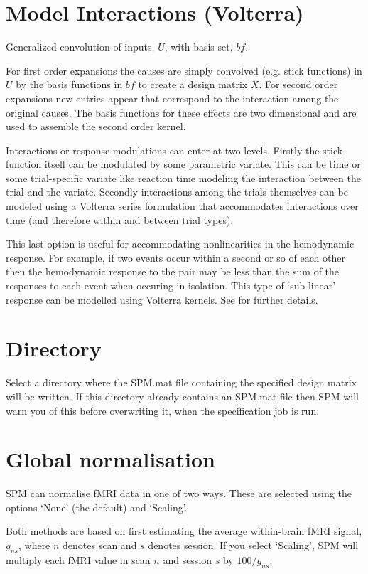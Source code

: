 \section{Model Interactions (Volterra)}

Generalized convolution of inputs, $U$, with basis set, $bf$.

For first order expansions the causes are simply convolved (e.g. stick functions) in $U$ by the basis functions in $bf$ to create a design matrix $X$.  For second order expansions new entries appear that correspond to the interaction among the original causes. The basis functions for these effects are two dimensional and are used to assemble the second order kernel. 

Interactions or response modulations can enter at two levels.  Firstly the stick function itself can be modulated by some parametric variate. This can be time or some trial-specific variate like reaction time modeling the interaction between the trial and the variate. Secondly interactions among the trials themselves can be modeled using a Volterra series formulation that accommodates interactions over time (and therefore within and between trial types). 

This last option is useful for accommodating nonlinearities in the hemodynamic response. For example, if two events occur within a second or so of each other then the hemodynamic response to the pair may be less than the sum of the responses to each event when occuring in isolation. This type of `sub-linear' response can be modelled using Volterra kernels. See \cite{balloon} for further details.

\section{Directory}

Select a directory where the SPM.mat file containing the specified design matrix will be written. If this directory already contains an SPM.mat file then SPM will warn you of this before overwriting it, when the specification job is run.

\section{Global normalisation}

SPM can normalise fMRI data in one of two ways. These are selected using the options `None' (the default) and `Scaling'.

Both methods are based on first estimating the average within-brain fMRI signal, $g_{ns}$, where $n$ denotes scan and $s$ denotes session. If you select `Scaling', SPM will multiply each fMRI value in scan $n$ and session $s$ by $100/g_{ns}$.

